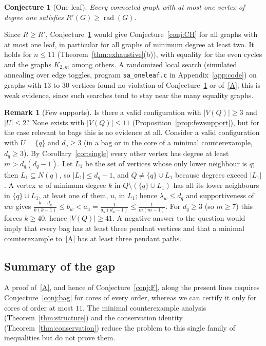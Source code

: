 \documentclass[11pt]{amsart}
\newtheorem{conjecture}[theorem]{Conjecture}
\theoremstyle{definition}
\newtheorem{remark}[theorem]{Remark}
\DeclareMathOperator{\rad}{rad}
\newcommand{\Rp}{R'}
\newcommand{\kmax}{11}
\begin{document}
\begin{conjecture}[One leaf]\label{conj:oneleaf}
Every connected graph with at most one vertex of degree one satisfies $\Rp(G)\ge\rad(G)$.
\end{conjecture}

Since $R\ge\Rp$, Conjecture~\ref{conj:oneleaf} would give Conjecture~\ref{conj:CH} for all graphs with at most one leaf,
in particular for all graphs of minimum degree at least two. It holds for $n\le11$ (Theorem~\ref{thm:exhaustive}(b)),
with equality for the even cycles and the graphs $K_{2,m}$ among others. A randomized local search (simulated annealing
over edge toggles, program \texttt{sa\_oneleaf.c} in Appendix~\ref{app:code}) on graphs with $13$ to $30$ vertices found
no violation of Conjecture~\ref{conj:oneleaf} or of~\eqref{A}; this is weak evidence, since such searches tend to stay
near the many equality graphs.

\begin{remark}[Few supports]\label{conj:few}
Is there a valid configuration with $|V(Q)|\ge3$ and $|U|\le2$? None exists with $|V(Q)|\le11$
(Proposition~\ref{prop:fewsupport}), but for the case relevant to bags this is no evidence at all. Consider a valid
configuration with $U=\{q\}$ and $d_q\ge3$ (in a bag or in the core of a minimal counterexample, $d_q\ge3$). By
Corollary~\ref{cor:single} every other vertex has degree at least $m>d_q(d_q-1)$. Let $L_1$ be the set of vertices whose only
lower neighbour is $q$; then $L_1\subseteq N(q)$, so $|L_1|\le d_q-1$, and $Q\neq\{q\}\cup L_1$ because degrees exceed
$|L_1|$. A vertex $w$ of minimum degree $k$ in $Q\setminus(\{q\}\cup L_1)$ has all its lower neighbours in $\{q\}\cup L_1$, at
least one of them, $u$, in $L_1$; hence $\lambda_w\le d_q$ and supportiveness of $uw$ gives
$\frac{k-d_q}{k(k-1)}\le b_w<a_u=\frac1{d_u(d_u-1)}\le\frac1{m(m-1)}$. For $d_q\ge3$ (so $m\ge7$) this forces $k\ge40$, hence
$|V(Q)|\ge41$. A negative answer to the question would imply that every bag has at least three pendant vertices and that a
minimal counterexample to~\eqref{A} has at least three pendant paths.
\end{remark}

\subsection*{Summary of the gap}
A proof of~\eqref{A}, and hence of Conjecture~\ref{conj:F}, along the present lines requires Conjecture~\ref{conj:bag}
for cores of every order, whereas we can certify it only for cores of order at most $\kmax$. The minimal counterexample
analysis (Theorem~\ref{thm:structure}) and the conservation identity (Theorem~\ref{thm:conservation}) reduce the problem
to this single family of inequalities but do not prove them.
\end{document}
